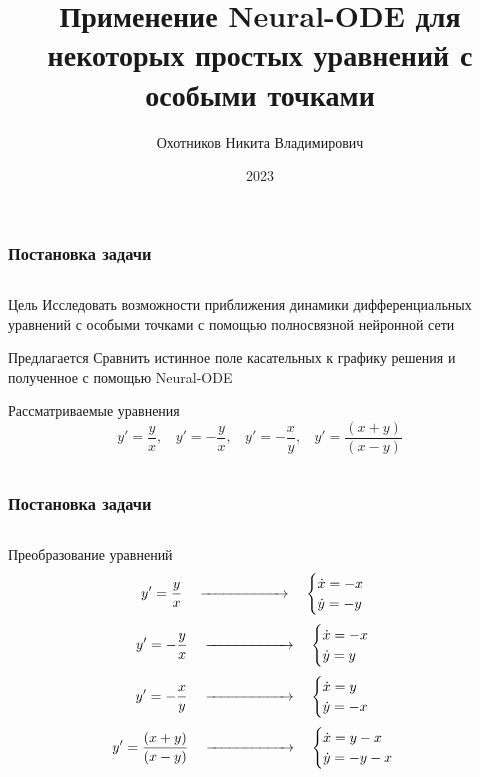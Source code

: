 \documentclass[8pt]{beamer}
\title[]{Применение Neural-ODE для некоторых простых уравнений с особыми точками}
\author{Охотников Никита Владимирович}
\institute{МФТИ}
\date{2023}
\newcommand\FontUP{\fontsize{12}{14}\selectfont}
\begin{document}
{
\begin{frame}
  \titlepage
\end{frame}
}

\begin{frame}
	\FontUP
	\frametitle{Постановка задачи}
	\begin{columns}
		\begin{column}{0.9\textwidth}
	
			\begin{block}{Цель}
				\smallskip
			Исследовать возможности приближения динамики дифференциальных уравнений с особыми точками  с помощью полносвязной нейронной сети
			\end{block}	
			\vfill
			\begin{block}{Предлагается}
				\smallskip
				Сравнить истинное поле касательных к графику решения и полученное с помощью Neural-ODE
			\end{block}	
			\vfill
			\begin{block}{Рассматриваемые уравнения}
				\smallskip
				$$y' = \frac{y}{x},~~~~y' = -\frac{y}{x},~~~~y' = -\frac{x}{y},~~~~y' = \frac{(x+y)}{(x-y)}$$
			\end{block}	
	     \end{column}
	\end{columns}
\end{frame}


\begin{frame}
	\FontUP
	\frametitle{Постановка задачи}
	\begin{columns}
		\begin{column}{0.9\textwidth}
			
			\begin{block}{Преобразование уравнений}
				\smallskip
				$$y' = \frac{y}{x} ~~~\xrightarrow{\hspace*{2cm}}~~~ \begin{cases} \dot{x} = -x \\ \dot{y} = -y
					\end{cases}$$
				$$y' = -\frac{y}{x}~~~\xrightarrow{\hspace*{2cm}}~~~ \begin{cases} \dot{x} = -x \\ \dot{y} = y
				\end{cases}$$
				$$y' = -\frac{x}{y}~~~\xrightarrow{\hspace*{2cm}}~~~ \begin{cases} \dot{x} = y \\ \dot{y} = -x
				\end{cases}$$
				$$y' = \frac{(x+y)}{(x-y)}~~~\xrightarrow{\hspace*{2cm}}~~~ \begin{cases} \dot{x} = y-x \\ \dot{y} = -y-x
				\end{cases}$$
			\end{block}	
		\end{column}
	\end{columns}
\end{frame}
\end{document}
